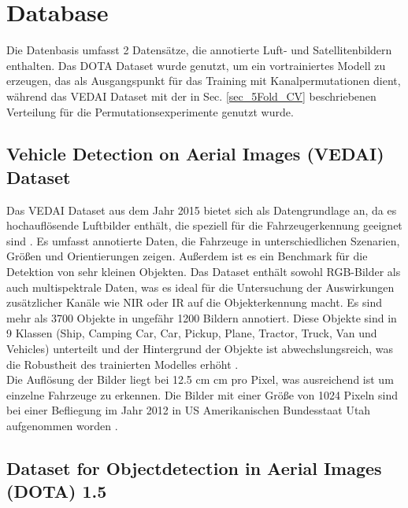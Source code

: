 \section{Database}
Die Datenbasis umfasst 2 Datensätze, die annotierte Luft- und Satellitenbildern enthalten. Das \acrshort{DOTA} Dataset wurde genutzt, um ein vortrainiertes Modell zu erzeugen, das als Ausgangspunkt für das Training mit Kanalpermutationen dient, während das \acrshort{VEDAI} Dataset mit der in Sec. \ref{sec_5Fold_CV} beschriebenen Verteilung für die Permutationsexperimente genutzt wurde.
\subsection{Vehicle Detection on Aerial Images (VEDAI) Dataset}
\label{subsec:VEDAI}

Das \Acrshort{VEDAI} Dataset \cite{vedai_web}  aus dem Jahr 2015 bietet sich als Datengrundlage an, da es hochauflösende Luftbilder enthält, die speziell für die Fahrzeugerkennung geeignet sind \cite{Razakarivony2015}. Es umfasst annotierte Daten, die Fahrzeuge in unterschiedlichen Szenarien, Größen und Orientierungen zeigen. Außerdem ist es ein Benchmark für die Detektion von sehr kleinen Objekten. Das Dataset enthält sowohl \acrshort{RGB}-Bilder als auch multispektrale Daten, was es ideal für die Untersuchung der Auswirkungen zusätzlicher Kanäle wie \acrshort{NIR} oder \acrshort{IR} auf die Objekterkennung macht. Es sind mehr als 3700 Objekte in ungefähr 1200 Bildern annotiert. Diese Objekte sind in 9 Klassen (Ship, Camping Car, Car, Pickup, Plane, Tractor, Truck, Van und Vehicles) unterteilt und der Hintergrund der Objekte ist abwechslungsreich, was die Robustheit des trainierten Modelles erhöht \cite{Razakarivony2015}. \\
Die Auflösung der Bilder liegt bei 12.5 cm  cm pro Pixel, was ausreichend ist um einzelne Fahrzeuge zu erkennen. Die Bilder mit einer Größe von 1024  Pixeln sind bei einer Befliegung im Jahr 2012 in US Amerikanischen Bundesstaat Utah aufgenommen worden \cite{Razakarivony2015}. 



\subsection{Dataset for Objectdetection in Aerial Images (DOTA) 1.5}
\label{subsec:DOTA}

